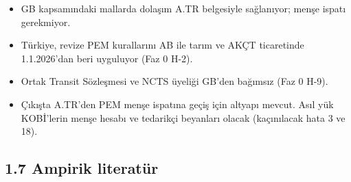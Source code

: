 \begin{itemize}
  \begin{itemize}
  \tightlist
  \item
    GB kapsamındaki mallarda dolaşım A.TR belgesiyle sağlanıyor; menşe ispatı gerekmiyor.
  \item
    Türkiye, revize PEM kurallarını AB ile tarım ve AKÇT ticaretinde 1.1.2026'dan beri uyguluyor (Faz 0 H-2).
  \item
    Ortak Transit Sözleşmesi ve NCTS üyeliği GB'den bağımsız (Faz 0 H-9).
  \item
    Çıkışta A.TR'den PEM menşe ispatına geçiş için altyapı mevcut. Asıl yük KOBİ'lerin menşe hesabı ve tedarikçi beyanları olacak (kaçınılacak hata 3 ve 18).
  \end{itemize}
\end{itemize}

\hypertarget{01_teshis-17-ampirik-literatuxfcr}{%
\subsection{1.7 Ampirik literatür}\label{01_teshis-17-ampirik-literatuxfcr}}

\begingroup\gbtablo\small

